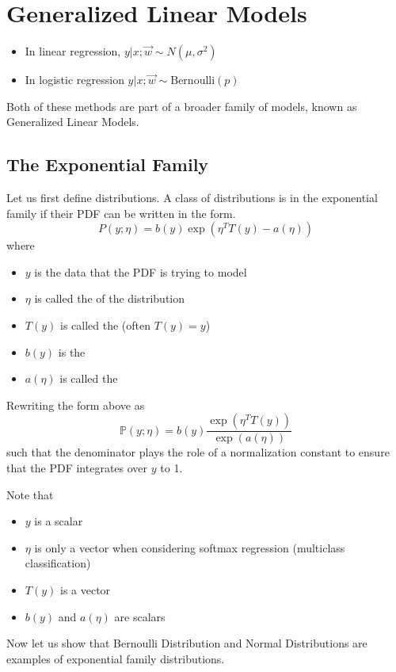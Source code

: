 \documentclass[12pt]{scrartcl}
\begin{document}
\section{Generalized Linear Models}
\begin{itemize}
    \item In linear regression, $y | x; \vec{w} \sim N(\mu, \sigma^2)$
    \item In logistic regression $y | x; \vec{w} \sim \text{Bernoulli}(p)$
\end{itemize}

Both of these methods are part of a broader family of models, known as
Generalized Linear Models.

\subsection{The Exponential Family}
\begin{definition}
    Let us first define  distributions. A class of distributions is in the exponential family if their PDF can be written in the form.
    \[P(y; \eta ) = b(y)\exp(\eta^TT(y) - a(\eta))\]
    where
    \begin{itemize}
        \item $y$ is the data that the PDF is trying to model
        \item $\eta$ is called the  of the distribution
        \item $T(y)$ is called the  (often $T(y) = y$)
        \item $b(y)$ is the 
        \item $a(\eta)$ is called the 
    \end{itemize}
\end{definition}

Rewriting the form above as
\[\mathbb{P}(y; \eta) = b(y) \frac{\exp(\eta^TT(y))}{\exp(a(\eta))}\] such that the denominator plays the role of a normalization constant to ensure
that the PDF integrates over $y$ to 1.

\begin{note}
    Note that
    \begin{itemize}
        \item $y$ is a scalar
        \item $\eta$ is only a vector when considering softmax regression (multiclass classification)
        \item $T(y)$ is a vector
        \item $b(y)$ and $a(\eta)$ are scalars
    \end{itemize}
\end{note}
Now let us show that Bernoulli Distribution and Normal Distributions are examples of exponential family distributions.
\end{document}
